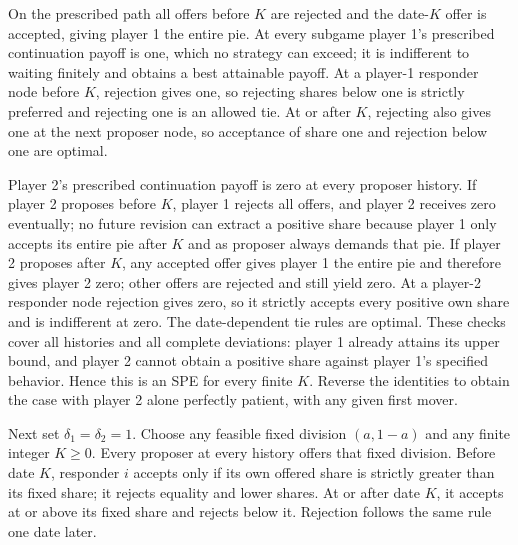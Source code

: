 \documentclass[11pt]{article}
\begin{document}
On the prescribed path all offers before $K$ are rejected and the date-$K$ offer is accepted, giving player 1 the entire pie. At every subgame player 1's prescribed continuation payoff is one, which no strategy can exceed; it is indifferent to waiting finitely and obtains a best attainable payoff. At a player-1 responder node before $K$, rejection gives one, so rejecting shares below one is strictly preferred and rejecting one is an allowed tie. At or after $K$, rejecting also gives one at the next proposer node, so acceptance of share one and rejection below one are optimal.

Player 2's prescribed continuation payoff is zero at every proposer history. If player 2 proposes before $K$, player 1 rejects all offers, and player 2 receives zero eventually; no future revision can extract a positive share because player 1 only accepts its entire pie after $K$ and as proposer always demands that pie. If player 2 proposes after $K$, any accepted offer gives player 1 the entire pie and therefore gives player 2 zero; other offers are rejected and still yield zero. At a player-2 responder node rejection gives zero, so it strictly accepts every positive own share and is indifferent at zero. The date-dependent tie rules are optimal. These checks cover all histories and all complete deviations: player 1 already attains its upper bound, and player 2 cannot obtain a positive share against player 1's specified behavior. Hence this is an SPE for every finite $K$. Reverse the identities to obtain the case with player 2 alone perfectly patient, with any given first mover.

Next set $\delta_1=\delta_2=1$. Choose any feasible fixed division $(a,1-a)$ and any finite integer $K\ge0$. Every proposer at every history offers that fixed division. Before date $K$, responder $i$ accepts only if its own offered share is strictly greater than its fixed share; it rejects equality and lower shares. At or after date $K$, it accepts at or above its fixed share and rejects below it. Rejection follows the same rule one date later.
\end{document}
